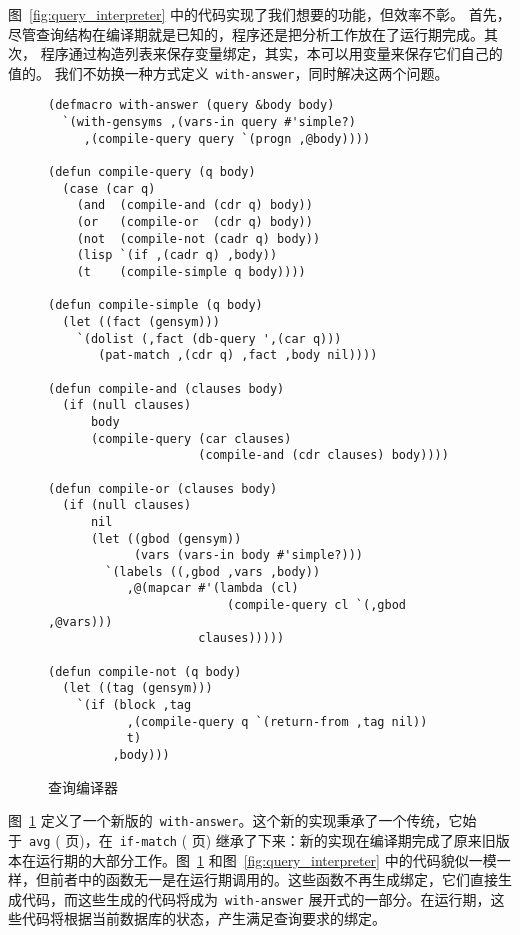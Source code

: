 图~\ref{fig:query_interpreter} 中的代码实现了我们想要的功能，但效率不彰。
首先，尽管查询结构在编译期就是已知的，程序还是把分析工作放在了运行期完成。其次，
程序通过构造列表来保存变量绑定，其实，本可以用变量来保存它们自己的值的。
我们不妨换一种方式定义~\texttt{with-answer}，同时解决这两个问题。

\begin{figure}
\begin{lstlisting}
(defmacro with-answer (query &body body)
  `(with-gensyms ,(vars-in query #'simple?)
     ,(compile-query query `(progn ,@body))))

(defun compile-query (q body)
  (case (car q)
    (and  (compile-and (cdr q) body))
    (or   (compile-or  (cdr q) body))
    (not  (compile-not (cadr q) body))
    (lisp `(if ,(cadr q) ,body))
    (t    (compile-simple q body))))

(defun compile-simple (q body)
  (let ((fact (gensym)))
    `(dolist (,fact (db-query ',(car q)))
       (pat-match ,(cdr q) ,fact ,body nil))))

(defun compile-and (clauses body)
  (if (null clauses)
      body
      (compile-query (car clauses)
                     (compile-and (cdr clauses) body))))

(defun compile-or (clauses body)
  (if (null clauses)
      nil
      (let ((gbod (gensym))
            (vars (vars-in body #'simple?)))
        `(labels ((,gbod ,vars ,body))
           ,@(mapcar #'(lambda (cl)
                         (compile-query cl `(,gbod ,@vars)))
                     clauses)))))

(defun compile-not (q body)
  (let ((tag (gensym)))
    `(if (block ,tag
           ,(compile-query q `(return-from ,tag nil))
           t)
         ,body)))
\end{lstlisting}
  \caption{查询编译器}
  \label{fig:query_compiler}
\end{figure}


图~\ref{fig:query_compiler} 定义了一个新版的~\texttt{with-answer}。这个新的实现秉承了一个传统，它始于~\texttt{avg} (\pageref{fig:shifting_computation_when_finding_averages} 页)，在~\texttt{if-match} (\pageref{macro:if-match} 页) 继承了下来：新的实现在编译期完成了原来旧版本在运行期的大部分工作。图~\ref{fig:query_compiler} 和图~\ref{fig:query_interpreter} 中的代码貌似一模一样，但前者中的函数无一是在运行期调用的。这些函数不再生成绑定，它们直接生成代码，而这些生成的代码将成为~\texttt{with-answer} 展开式的一部分。在运行期，这些代码将根据当前数据库的状态，产生满足查询要求的绑定。

